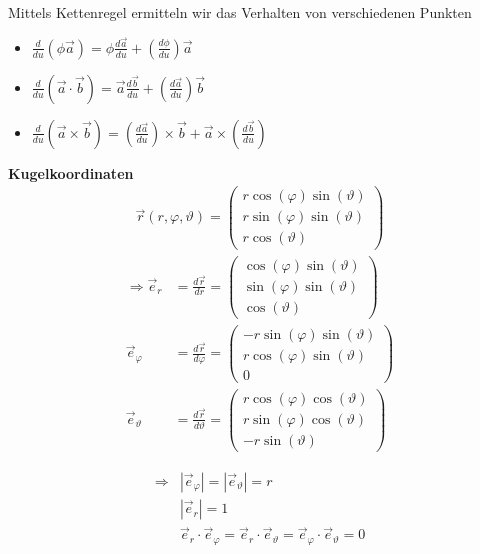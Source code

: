 \begin{Bemerkung}
 Mittels Kettenregel ermitteln wir das Verhalten von verschiedenen Punkten
 \begin{itemize}
  \item
  $\frac{d}{du}(\phi \vec{a}) = \phi \frac{d\vec{a}}{du} + \left(\frac{d\phi}{du}\right)\vec{a}$
  \item
  $\frac{d}{du}(\vec{a}\cdot\vec{b}) = \vec{a} \frac{d\vec{b}}{du} + \left(\frac{d\vec{a}}{du}\right)\vec{b}$
  \item
  $\frac{d}{du}(\vec{a}\times\vec{b}) = 
   \left(\frac{d\vec{a}}{du}\right)\times\vec{b} +  \vec{a} \times \left(
   \frac{d\vec{b}}{du}\right)$
 \end{itemize}
\end{Bemerkung}
\begin{Beispiel}{\bf  Kugelkoordinaten}
\begin{align*}
 \vec{r}(r,\varphi,\vartheta) = \begin{pmatrix}r\cos(\varphi)\sin(\vartheta)\\r\sin(\varphi)\sin(\vartheta)\\r\cos(\vartheta)\end{pmatrix}
\end{align*}
\begin{align*}
 \Rightarrow \vec{e}_r &= \frac{d\vec{r}}{dr} = \begin{pmatrix}\cos(\varphi)\sin(\vartheta)\\\sin(\varphi)\sin(\vartheta)\\\cos(\vartheta)\end{pmatrix}\\
 \vec{e}_\varphi &= \frac{d\vec{r}}{d\varphi} = \begin{pmatrix}-r\sin(\varphi)\sin(\vartheta)\\r\cos(\varphi)\sin(\vartheta)\\0\end{pmatrix}\\
 \vec{e}_\vartheta &= \frac{d\vec{r}}{d\vartheta} = \begin{pmatrix}r\cos(\varphi)\cos(\vartheta)\\r\sin(\varphi)\cos(\vartheta)\\-r\sin(\vartheta)\end{pmatrix}
\end{align*}

\begin{align*}
\Rightarrow &|\vec{e}_\varphi| = |\vec{e}_\vartheta| = r\\
&|\vec{e}_r| = 1\\
&\vec{e}_r\cdot\vec{e}_\varphi = \vec{e}_r\cdot\vec{e}_\vartheta =
\vec{e}_\varphi\cdot\vec{e}_\vartheta = 0
\end{align*}
\end{Beispiel}

